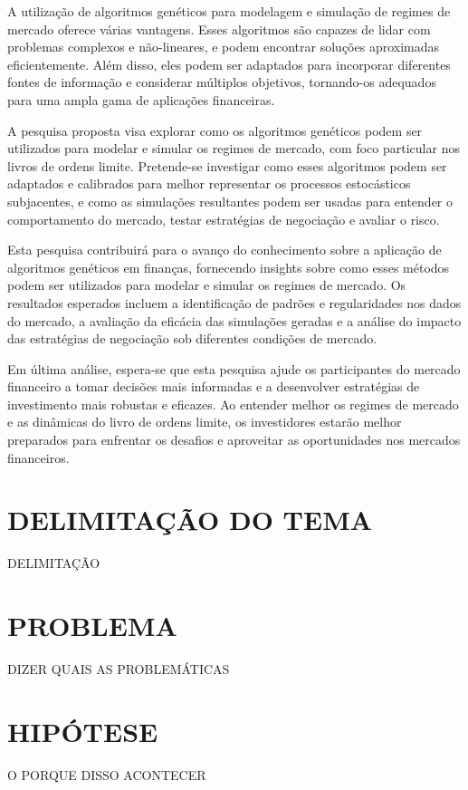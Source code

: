 \documentclass{pre-project}
\begin{document}
A utilização de algoritmos genéticos para modelagem e simulação de regimes de mercado oferece várias vantagens. Esses algoritmos são capazes de lidar com problemas complexos e não-lineares, e podem encontrar soluções aproximadas eficientemente. Além disso, eles podem ser adaptados para incorporar diferentes fontes de informação e considerar múltiplos objetivos, tornando-os adequados para uma ampla gama de aplicações financeiras.

A pesquisa proposta visa explorar como os algoritmos genéticos podem ser utilizados para modelar e simular os regimes de mercado, com foco particular nos livros de ordens limite. Pretende-se investigar como esses algoritmos podem ser adaptados e calibrados para melhor representar os processos estocásticos subjacentes, e como as simulações resultantes podem ser usadas para entender o comportamento do mercado, testar estratégias de negociação e avaliar o risco.

Esta pesquisa contribuirá para o avanço do conhecimento sobre a aplicação de algoritmos genéticos em finanças, fornecendo insights sobre como esses métodos podem ser utilizados para modelar e simular os regimes de mercado. Os resultados esperados incluem a identificação de padrões e regularidades nos dados do mercado, a avaliação da eficácia das simulações geradas e a análise do impacto das estratégias de negociação sob diferentes condições de mercado.

Em última análise, espera-se que esta pesquisa ajude os participantes do mercado financeiro a tomar decisões mais informadas e a desenvolver estratégias de investimento mais robustas e eficazes. Ao entender melhor os regimes de mercado e as dinâmicas do livro de ordens limite, os investidores estarão melhor preparados para enfrentar os desafios e aproveitar as oportunidades nos mercados financeiros.
	
\chapter{DELIMITAÇÃO DO TEMA}	
	DELIMITAÇÃO
	
\chapter{PROBLEMA}
DIZER QUAIS AS PROBLEMÁTICAS
	
\chapter{HIPÓTESE}
O PORQUE DISSO ACONTECER
	
\end{document}
